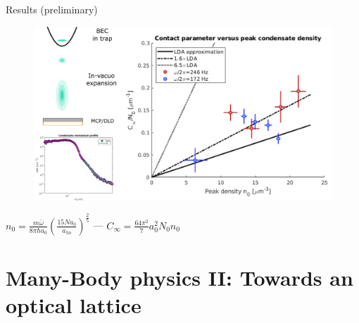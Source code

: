\documentclass{beamer}
\begin{document}
  

\begin{frame}{Results (preliminary)}
    \begin{figure}
        \centering
        \includegraphics[width=\textwidth]{figures/QD/our_reproduction.png}  
        \label{fig:my_label}
    \end{figure}
    \begin{center}
    $n_0 = \frac{m  \bar{\omega}}{8\pi\hbar a_0 }\left(\frac{15 N a_0}{a_{ho}}\right)^\frac{2}{5}$ --- $C_\infty =\frac{64\pi^2}{7}a_{0}^2N_0n_0$    
    \end{center}
\end{frame}




\section{Many-Body physics II: Towards an optical lattice}
\end{document}
